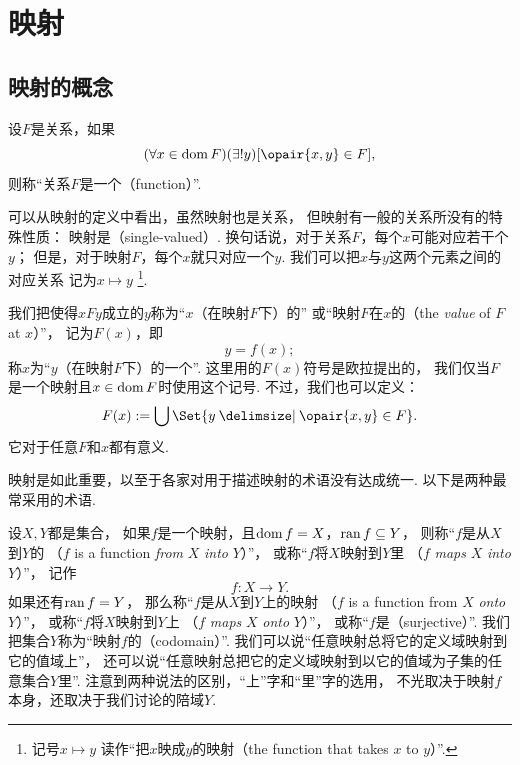 \section{映射}
\subsection{映射的概念}
\begin{definition}
设\(F\)是关系，如果\begin{equation*}
	(\forall x \in \dom F)(\exists! y)[\opair{x,y} \in F],
\end{equation*}
则称“关系\(F\)是一个（function）”.
\end{definition}
可以从映射的定义中看出，虽然映射也是关系，
但映射有一般的关系所没有的特殊性质：
映射是（single-valued）.
换句话说，对于关系\(F\)，每个\(x\)可能对应若干个\(y\)；
但是，对于映射\(F\)，每个\(x\)就只对应一个\(y\).
我们可以把\(x\)与\(y\)这两个元素之间的对应关系
记为\(x \mapsto y\) \footnote{
	记号\(x \mapsto y\)
	读作“把\(x\)映成\(y\)的映射（the function that takes \(x\) to \(y\)）”.
}.

我们把使得\(xFy\)成立的\(y\)称为“\(x\)（在映射\(F\)下）的”
或“映射\(F\)在\(x\)的（the \emph{value} of \(F\) at \(x\)）”，
记为\(F(x)\)，即\begin{equation*}
	y = f(x);
\end{equation*}
称\(x\)为“\(y\)（在映射\(F\)下）的一个”.
这里用的\(F(x)\)符号是欧拉提出的，
我们仅当\(F\)是一个映射且\(x\in\operatorname{dom} F\)时使用这个记号.
不过，我们也可以定义：\begin{equation*}
	F(x) \defeq \bigcup\Set{ y \given \opair{x,y} \in F }.
\end{equation*}
它对于任意\(F\)和\(x\)都有意义.

映射是如此重要，以至于各家对用于描述映射的术语没有达成统一.
以下是两种最常采用的术语.

设\(X,Y\)都是集合，
如果\(f\)是一个映射，且\(\operatorname{dom} f = X\)，\(\operatorname{ran} f \subseteq Y\)，
则称“\(f\)是从\(X\)到\(Y\)的%
（\(f\) is a function \emph{from} \(X\) \emph{into} \(Y\)）”，
或称“\(f\)将\(X\)映射到\(Y\)里%
（\(f\) \emph{maps} \(X\) \emph{into} \(Y\)）”，
记作\begin{equation*}
	f\colon X \to Y.
\end{equation*}
如果还有\(\operatorname{ran} f = Y\)，
那么称“\(f\)是从\(X\)到\(Y\)上的映射%
（\(f\) is a function from \(X\) \emph{onto} \(Y\)）”，
或称“\(f\)将\(X\)映射到\(Y\)上%
（\(f\) \emph{maps} \(X\) \emph{onto} \(Y\)）”，
或称“\(f\)是（surjective）”.
我们把集合\(Y\)称为“映射\(f\)的（codomain）”.
我们可以说“任意映射总将它的定义域映射到它的值域上”，
还可以说“任意映射总把它的定义域映射到以它的值域为子集的任意集合\(Y\)里”.
注意到两种说法的区别，“上”字和“里”字的选用，
不光取决于映射\(f\)本身，还取决于我们讨论的陪域\(Y\).

